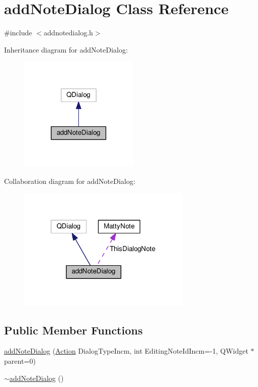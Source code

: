 \hypertarget{classadd_note_dialog}{}\section{add\+Note\+Dialog Class Reference}
\label{classadd_note_dialog}


{\ttfamily \#include $<$addnotedialog.\+h$>$}



Inheritance diagram for add\+Note\+Dialog\+:
\nopagebreak
\begin{figure}[H]
\begin{center}
\leavevmode
\includegraphics[width=161pt]{classadd_note_dialog__inherit__graph}
\end{center}
\end{figure}


Collaboration diagram for add\+Note\+Dialog\+:
\nopagebreak
\begin{figure}[H]
\begin{center}
\leavevmode
\includegraphics[width=235pt]{classadd_note_dialog__coll__graph}
\end{center}
\end{figure}
\subsection*{Public Member Functions}
\begin{DoxyCompactItemize}
\item 
\hyperlink{classadd_note_dialog_a304ad6104e976c766645b32f5e91b88c}{add\+Note\+Dialog} (\hyperlink{addnotedialog_8h_a8bb1ef53467e4f61410d12822d922498}{Action} Dialog\+Type\+Incm, int Editing\+Note\+Id\+Incm=-\/1, Q\+Widget $\ast$parent=0)
\item 
\hyperlink{classadd_note_dialog_a900c8ab72a54252fa03299d821af644f}{$\sim$add\+Note\+Dialog} ()
\end{DoxyCompactItemize}
